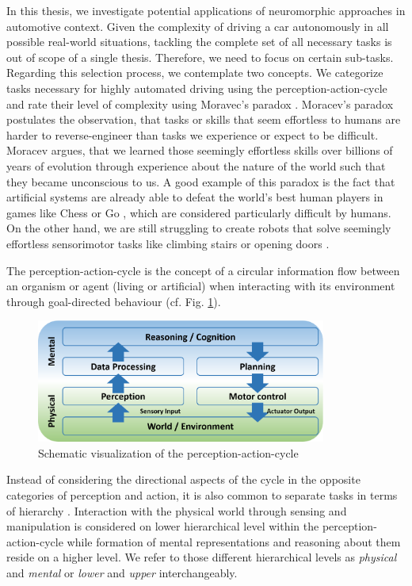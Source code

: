 In this thesis, we investigate potential applications of neuromorphic approaches in automotive context.
Given the complexity of driving a car autonomously in all possible real-world situations, tackling the complete set of all necessary tasks is out of scope of a single thesis.
Therefore, we need to focus on certain sub-tasks.
Regarding this selection process, we contemplate two concepts.
We categorize tasks necessary for highly automated driving using the perception-action-cycle and rate their level of complexity using Moravec's paradox \cite{Moravec1988}.
Moracev's paradox postulates the observation, that tasks or skills that seem effortless to humans are harder to reverse-engineer than tasks we experience or expect to be difficult.
Moracev argues, that we learned those seemingly effortless skills over billions of years of evolution through experience about the nature of the world such that they became unconscious to us.
A good example of this paradox is the fact that artificial systems are already able to defeat the world's best human players in games like Chess \cite{Hsu2002} or Go \cite{Silver2016}, which are considered particularly difficult by humans.
On the other hand, we are still struggling to create robots that solve seemingly effortless sensorimotor tasks like climbing stairs or opening doors \cite{Guizzo2015, Norton2017}.

The perception-action-cycle \cite{Fuster2004} is the concept of a circular information flow between an organism or agent (living or artificial) when interacting with its environment through goal-directed behaviour (cf. Fig. \ref{fig:perc-act-cicle}).
\begin{figure}[t!]
	\centering
	\includegraphics[width=0.85\textwidth]{imgs/ActionPerceptionCycle.eps}
	\caption{Schematic visualization of the perception-action-cycle}
	\label{fig:perc-act-cicle}
\end{figure}
Instead of considering the directional aspects of the cycle in the opposite categories of perception and action, it is also common to separate tasks in terms of hierarchy \cite{Loeb2014}.
Interaction with the physical world through sensing and manipulation is considered on lower hierarchical level within the perception-action-cycle while formation of mental representations and reasoning about them reside on a higher level.
We refer to those different hierarchical levels as \emph{physical} and \emph{mental} or \emph{lower} and \emph{upper} interchangeably.

